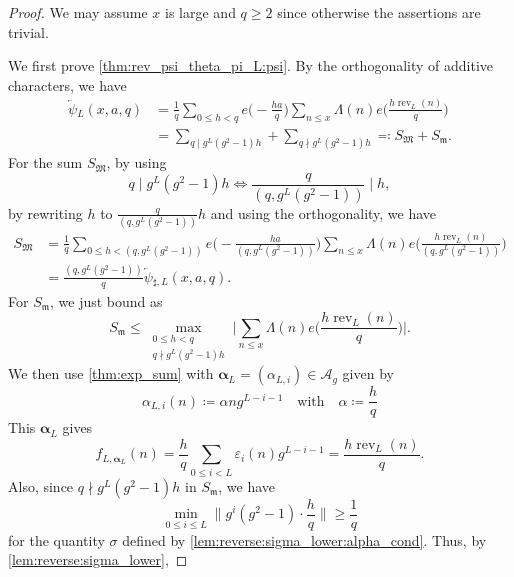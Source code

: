 \documentclass[hidelinks]{amsart}
\numberwithin{equation}{section}
\theoremstyle{plain}
\theoremstyle{definition}
\let\tmp\phi
\let\phi\varphi
\let\varphi\tmp
\let\tmp\epsilon
\let\epsilon\varepsilon
\let\varepsilon\tmp
\DeclareMathOperator{\rev}{rev}
\newcommand{\arev}{\overleftarrow}
\begin{document}
\begin{proof}
We may assume $x$ is large and $q\ge2$ since otherwise the assertions are trivial.

We first prove \cref{thm:rev_psi_theta_pi_L:psi}.
By the orthogonality of additive characters, we have
\begin{equation}
\label{thm:rev_psi_theta_pi_L:decomp}
\begin{aligned}
\arev{\psi}\!_{L}(x,a,q)
&=
\frac{1}{q}
\sum_{0\le h<q}
e\biggl(-\frac{ha}{q}\biggr)
\sum_{n\le x}
\Lambda(n)
e\biggl(\frac{h\rev_{L}(n)}{q}\biggr)\\
&=
\sum_{q\mid g^{L}(g^{2}-1)h}
+
\sum_{q\nmid g^{L}(g^{2}-1)h}
\eqqcolon
S_{\mathfrak{M}}+S_{\mathfrak{m}}.
\end{aligned}
\end{equation}
For the sum $S_{\mathfrak{M}}$, by using
\[
q\mid g^{L}(g^{2}-1)h
\iff
\frac{q}{(q,g^{L}(g^{2}-1))}\mid h,
\]
by rewriting $h$ to $\frac{q}{(q,g^{L}(g^{2}-1))}h$ and using the orthogonality, we have
\begin{equation}
\label{thm:rev_psi_theta_pi_L:S_Major}
\begin{aligned}
S_{\mathfrak{M}}
&=
\frac{1}{q}
\sum_{0\le h<(q,g^{L}(g^{2}-1))}
e\biggl(-\frac{ha}{(q,g^{L}(g^{2}-1))}\biggr)
\sum_{n\le x}
\Lambda(n)
e\biggl(\frac{h\rev_{L}(n)}{(q,g^{L}(g^{2}-1))}\biggr)\\
&=
\frac{(q,g^{L}(g^{2}-1))}{q}
\arev{\psi}\!_{\sharp,L}(x,a,q).
\end{aligned}
\end{equation}
For $S_{\mathfrak{m}}$, we just bound as
\begin{equation}
\label{thm:rev_psi_theta_pi_L:S_minor:abs}
S_{\mathfrak{m}}
\le
\max_{\substack{
0\le h<q\\
q\nmid g^{L}(g^{2}-1)h
}}
\biggl|
\sum_{n\le x}
\Lambda(n)
e\biggl(\frac{h\rev_{L}(n)}{q}\biggr)
\biggr|.
\end{equation}
We then use \cref{thm:exp_sum} with $\bm{\alpha}_{L}=(\alpha_{L,i})\in\mathscr{A}_{g}$ given by
\[
\alpha_{L,i}(n)
\coloneqq
\alpha ng^{L-i-1}
\quad\text{with}\quad
\alpha
\coloneqq
\frac{h}{q}
\]
This $\bm{\alpha}_{L}$ gives
\[
f_{L,\bm{\alpha}_{L}}(n)
=
\frac{h}{q}\sum_{0\le i<L}\epsilon_{i}(n)g^{L-i-1}
=
\frac{h\rev_{L}(n)}{q}.
\]
Also, since $q\nmid g^{L}(g^{2}-1)h$ in $S_{\mathfrak{m}}$, we have
\[
\min_{0\le i\le L}\biggl\|g^{i}(g^{2}-1)\cdot\frac{h}{q}\biggr\|
\ge
\frac{1}{q}
\]
for the quantity $\sigma$ defined by \cref{lem:reverse:sigma_lower:alpha_cond}.
Thus, by \cref{lem:reverse:sigma_lower},

\end{proof}
\end{document}
